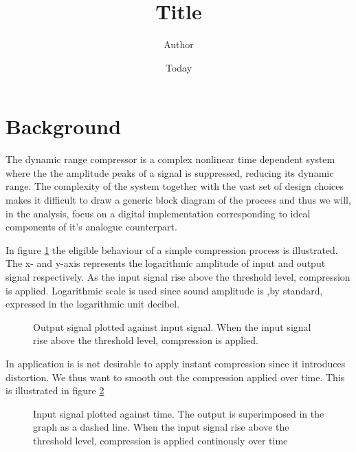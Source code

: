 \documentclass[]{article}
\begin{document}
\title{Title}
\author{Author}
\date{Today}
\maketitle
\section{Background}
The dynamic range compressor is a complex nonlinear time dependent system where the the amplitude peaks of a signal is suppressed, reducing its dynamic range. The complexity of the system together with the vast set of design choices makes it difficult to draw a generic block diagram of the process\cite{giannoullis}  and thus we will, in the analysis, focus on a digital implementation corresponding to ideal components of it's analogue counterpart. 

In figure \ref{fig:xy-graph} the eligible behaviour of a simple compression process is illustrated. The x- and y-axis represents the logarithmic amplitude of input and output signal respectively. As the input signal rise above the threshold level, compression is applied. Logarithmic scale is used since sound amplitude is ,by standard, expressed in the logarithmic unit decibel.

\begin{figure}[ht]
\centering

\caption{Output signal plotted against input signal. When the input signal rise above the threshold level, compression is applied.} 
\label{fig:xy-graph}
\end{figure}

In application is is not desirable to apply instant compression since it introduces distortion\cite{giannoullis}. We thus want to smooth out the compression applied over time. This is illustrated in figure \ref{fig:envelope-graph}

\begin{figure}[ht]
\centering

\caption{Input signal plotted against time. The output is superimposed in the graph as a dashed line. When the input signal rise above the threshold level, compression is applied continously over time } 
\label{fig:envelope-graph}
\end{figure}



\end{document}
